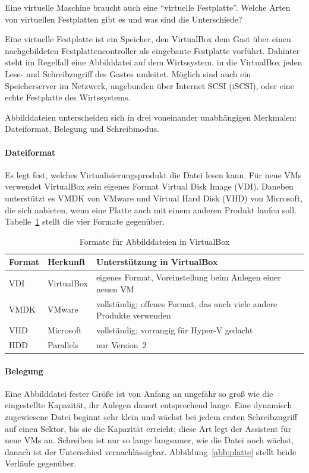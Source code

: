 \begin{aufgabe}
Eine virtuelle Maschine braucht auch eine \enquote{virtuelle Festplatte}. Welche Arten von virtuellen Festplatten gibt es und was sind die Unterschiede?
\end{aufgabe}
\label{sec:festplatte}

Eine virtuelle Festplatte ist ein Speicher, den VirtualBox dem Gast über einen nachgebildeten Festplattencontroller als eingebaute Festplatte vorführt. Dahinter steht im Regelfall eine Abbilddatei auf dem Wirtssystem, in die VirtualBox jeden Lese- und Schreibzugriff des Gastes umleitet. Möglich sind auch ein Speicherserver im Netzwerk, angebunden über Internet SCSI (iSCSI), oder eine echte Festplatte des Wirtssystems.

Abbilddateien unterscheiden sich in drei voneinander unabhängigen Merkmalen: Dateiformat, Belegung und Schreibmodus.

\paragraph{Dateiformat} Es legt fest, welches Virtualisierungsprodukt die Datei lesen kann. Für neue VMs verwendet VirtualBox sein eigenes Format Virtual Disk Image (VDI). Daneben unterstützt es VMDK von VMware und Virtual Hard Disk (VHD) von Microsoft, die sich anbieten, wenn eine Platte auch mit einem anderen Produkt laufen soll. Tabelle~\ref{tab:plattenformate} stellt die vier Formate gegenüber.

\begin{table}[H]
\centering
\caption{Formate für Abbilddateien in VirtualBox}
\label{tab:plattenformate}
\begin{tabularx}{\textwidth}{@{}llX@{}}
\toprule
\textbf{Format} & \textbf{Herkunft} & \textbf{Unterstützung in VirtualBox} \\
\midrule
VDI & VirtualBox & eigenes Format, Voreinstellung beim Anlegen einer neuen VM \\
VMDK & VMware & vollständig; offenes Format, das auch viele andere Produkte verwenden \\
VHD & Microsoft & vollständig; vorrangig für Hyper-V gedacht \\
HDD & Parallels & nur Version~2 \\
\bottomrule
\end{tabularx}
\end{table}

\paragraph{Belegung} Eine Abbilddatei fester Größe ist von Anfang an ungefähr so groß wie die eingestellte Kapazität, ihr Anlegen dauert entsprechend lange. Eine dynamisch zugewiesene Datei beginnt sehr klein und wächst bei jedem ersten Schreibzugriff auf einen Sektor, bis sie die Kapazität erreicht; diese Art legt der Assistent für neue VMs an. Schreiben ist nur so lange langsamer, wie die Datei noch wächst, danach ist der Unterschied vernachlässigbar. Abbildung~\ref{abb:platte} stellt beide Verläufe gegenüber.

